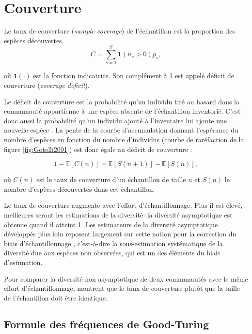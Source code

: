 \documentclass[
  11pt,
  american,
  a4paper,
  extrafontsizes,onecolumn,openright
  ]{memoir}
\begin{document}
\section{Couverture}\label{sec-Couverture}

Le taux de couverture (\emph{sample coverage}) de l'échantillon est la proportion des espèces découvertes,
\begin{equation}
  \label{eq:C}
  C = \sum^S_{s=1}{{\mathbf 1}\left( n_s > 0 \right) p_s},
\end{equation}

où \({\mathbf 1}(\cdot)\) est la fonction indicatrice.
Son complément à 1 est appelé déficit de couverture (\emph{coverage deficit}).

Le déficit de couverture est la probabilité qu'un individu tiré au hasard dans la communauté appartienne à une espèce absente de l'échantillon inventorié.
C'est donc aussi la probabilité qu'un individu ajouté à l'inventaire lui ajoute une nouvelle espèce \autocite{Good1953}.
La pente de la courbe d'accumulation donnant l'espérance du nombre d'espèces en fonction du nombre d'individus (courbe de raréfaction de la figure \ref{fig:Gotelli2001}) est donc égale au déficit de couverture \autocite{Chao2012b}:

\begin{equation}
  \label{eq:DefC}
  1 - {\mathbb E}\left[ C\left( n \right) \right] = {\mathbb E}\left[ S\left( n + 1 \right) \right] - {\mathbb E}\left[ S\left( n \right) \right],
\end{equation}

où \(C(n)\) est le taux de couverture d'un échantillon de taille \(n\) et \(S(n)\) le nombre d'espèces découvertes dans cet échantillon.

Le taux de couverture augmente avec l'effort d'échantillonnage.
Plus il est élevé, meilleures seront les estimations de la diversité: la diversité asymptotique est obtenue quand il atteint 1.
Les estimateurs de la diversité asymptotique développés plus loin reposent largement sur cette notion pour la correction du biais d'échantillonnage \autocite{Dauby2012}, c'est-à-dire la sous-estimation systématique de la diversité due aux espèces non observées, qui est un des éléments du biais d'estimation.

Pour comparer la diversité non asymptotique de deux communautés avec le même effort d'échantillonnage, \textcite{Chao2012b} montrent que le taux de couverture plutôt que la taille de l'échantillon doit être identique.

\subsection{Formule des fréquences de Good-Turing}\label{formule-des-fruxe9quences-de-good-turing}
\end{document}
